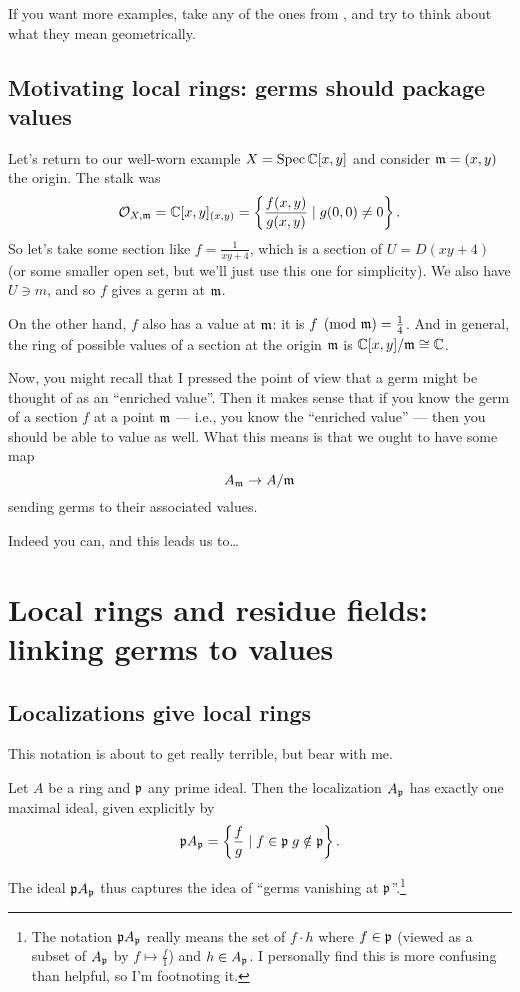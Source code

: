 If you want more examples,
take any of the ones from ,
and try to think about what they mean geometrically.

\subsection{Motivating local rings: germs should package values}
Let's return to our well-worn example $X = \operatorname{Spec} \mathbb C[x,y]$
and consider $\mathfrak m = (x,y)$ the origin.
The stalk was
\[ \mathcal O_{X, \mathfrak m} = \mathbb C[x,y]_{(x,y)}
	= \left\{ \frac{f(x,y)}{g(x,y)} \mid g(0,0) \neq 0 \right\}. \]
So let's take some section like $f = \frac{1}{xy + 4}$,
which is a section of $U = D(xy+4)$ (or some smaller open set,
but we'll just use this one for simplicity).
We also have $U \ni m$, and so $f$ gives a germ at $\mathfrak m$.

On the other hand, $f$ also has a value at $\mathfrak m$:
it is $f \pmod{\mathfrak m} = \frac 14$.
And in general, the ring of possible values of a section
at the origin $\mathfrak m$ is $\mathbb C[x,y] / \mathfrak m \cong \mathbb C$.

Now, you might recall that I pressed the point of view
that a germ might be thought of as an ``enriched value''.
Then it makes sense that if you know the germ of a section $f$ at
a point $\mathfrak m$ --- i.e., you know the ``enriched value'' ---
then you should be able to value as well.
What this means is that we ought to have some map
\[ A_\mathfrak m \to A/\mathfrak m \]
sending germs to their associated values.

Indeed you can, and this leads us to\dots

\section{Local rings and residue fields:
linking germs to values}

\subsection{Localizations give local rings}
This notation is about to get really terrible, but bear with me.
\begin{theorem}
	\label{thm:stalks_local_ring}
	Let $A$ be a ring and $\mathfrak p$ any prime ideal.
	Then the localization $A_\mathfrak p$ has exactly one maximal ideal,
	given explicitly by
	\[ \mathfrak p A_\mathfrak p =
		\left\{ \frac fg \mid f \in \mathfrak p \; g \notin \mathfrak p \right\}. \]
\end{theorem}
The ideal $\mathfrak p A_\mathfrak p$ thus captures the idea
of ``germs vanishing at $\mathfrak p$''.\footnote{The notation $\mathfrak p A_\mathfrak p$ really means
the set of $f \cdot h$ where $f \in \mathfrak p$
(viewed as a subset of $A_\mathfrak p$ by $f \mapsto \frac f1$) and $h \in A_{\mathfrak p}$.
I personally find this is more confusing than helpful,
so I'm footnoting it.}

